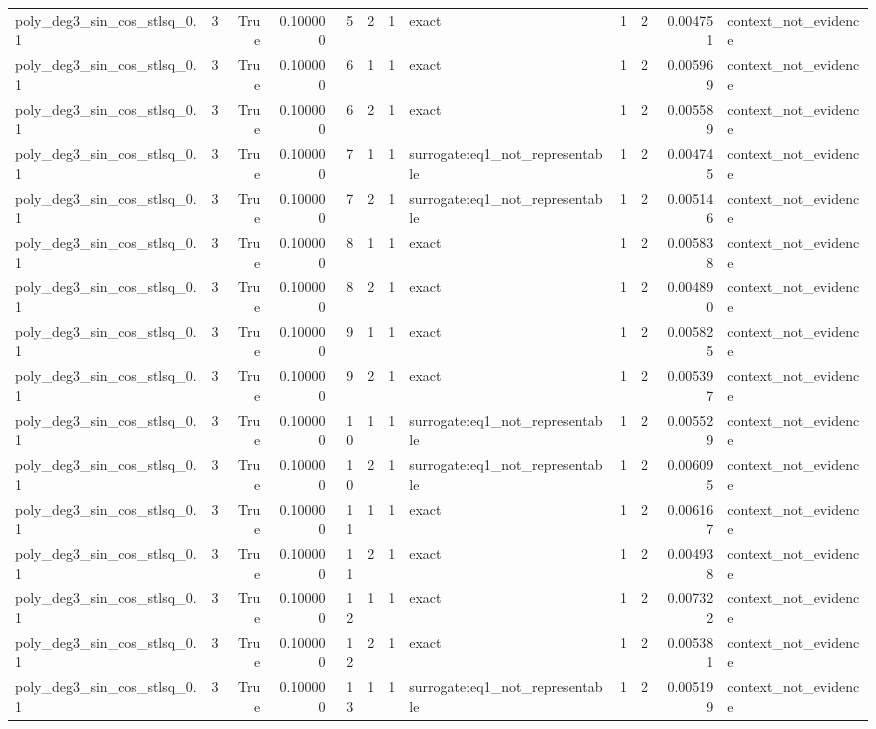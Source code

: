 \begin{tabular}{lrrrrrrlrrrl}
poly\_deg3\_sin\_cos\_stlsq\_0.1 & 3 & True & 0.100000 & 5 & 2 & 1 & exact & 1 & 2 & 0.004751 & context\_not\_evidence \\
poly\_deg3\_sin\_cos\_stlsq\_0.1 & 3 & True & 0.100000 & 6 & 1 & 1 & exact & 1 & 2 & 0.005969 & context\_not\_evidence \\
poly\_deg3\_sin\_cos\_stlsq\_0.1 & 3 & True & 0.100000 & 6 & 2 & 1 & exact & 1 & 2 & 0.005589 & context\_not\_evidence \\
poly\_deg3\_sin\_cos\_stlsq\_0.1 & 3 & True & 0.100000 & 7 & 1 & 1 & surrogate:eq1\_not\_representable & 1 & 2 & 0.004745 & context\_not\_evidence \\
poly\_deg3\_sin\_cos\_stlsq\_0.1 & 3 & True & 0.100000 & 7 & 2 & 1 & surrogate:eq1\_not\_representable & 1 & 2 & 0.005146 & context\_not\_evidence \\
poly\_deg3\_sin\_cos\_stlsq\_0.1 & 3 & True & 0.100000 & 8 & 1 & 1 & exact & 1 & 2 & 0.005838 & context\_not\_evidence \\
poly\_deg3\_sin\_cos\_stlsq\_0.1 & 3 & True & 0.100000 & 8 & 2 & 1 & exact & 1 & 2 & 0.004890 & context\_not\_evidence \\
poly\_deg3\_sin\_cos\_stlsq\_0.1 & 3 & True & 0.100000 & 9 & 1 & 1 & exact & 1 & 2 & 0.005825 & context\_not\_evidence \\
poly\_deg3\_sin\_cos\_stlsq\_0.1 & 3 & True & 0.100000 & 9 & 2 & 1 & exact & 1 & 2 & 0.005397 & context\_not\_evidence \\
poly\_deg3\_sin\_cos\_stlsq\_0.1 & 3 & True & 0.100000 & 10 & 1 & 1 & surrogate:eq1\_not\_representable & 1 & 2 & 0.005529 & context\_not\_evidence \\
poly\_deg3\_sin\_cos\_stlsq\_0.1 & 3 & True & 0.100000 & 10 & 2 & 1 & surrogate:eq1\_not\_representable & 1 & 2 & 0.006095 & context\_not\_evidence \\
poly\_deg3\_sin\_cos\_stlsq\_0.1 & 3 & True & 0.100000 & 11 & 1 & 1 & exact & 1 & 2 & 0.006167 & context\_not\_evidence \\
poly\_deg3\_sin\_cos\_stlsq\_0.1 & 3 & True & 0.100000 & 11 & 2 & 1 & exact & 1 & 2 & 0.004938 & context\_not\_evidence \\
poly\_deg3\_sin\_cos\_stlsq\_0.1 & 3 & True & 0.100000 & 12 & 1 & 1 & exact & 1 & 2 & 0.007322 & context\_not\_evidence \\
poly\_deg3\_sin\_cos\_stlsq\_0.1 & 3 & True & 0.100000 & 12 & 2 & 1 & exact & 1 & 2 & 0.005381 & context\_not\_evidence \\
poly\_deg3\_sin\_cos\_stlsq\_0.1 & 3 & True & 0.100000 & 13 & 1 & 1 & surrogate:eq1\_not\_representable & 1 & 2 & 0.005199 & context\_not\_evidence \\

\end{tabular}
